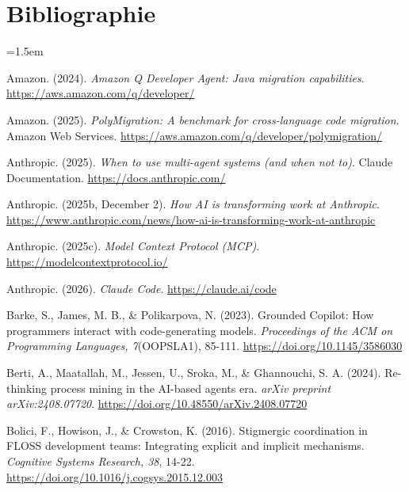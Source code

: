 
\chapter*{Bibliographie}

\begingroup
\setlength{\parskip}{0.6em}
\setlength{\parindent}{-1.5em}
\leftskip=1.5em\noindent



Amazon. (2024). \emph{Amazon Q Developer Agent: Java migration
capabilities}. \url{https://aws.amazon.com/q/developer/}

Amazon. (2025). \emph{PolyMigration: A benchmark for cross-language code
migration}. Amazon Web Services.
\url{https://aws.amazon.com/q/developer/polymigration/}

Anthropic. (2025). \emph{When to use multi-agent systems (and when not
to)}. Claude Documentation. \url{https://docs.anthropic.com/}

Anthropic. (2025b, December 2). \emph{How AI is transforming work at
Anthropic}.
\url{https://www.anthropic.com/news/how-ai-is-transforming-work-at-anthropic}

Anthropic. (2025c). \emph{Model Context Protocol (MCP)}.
\url{https://modelcontextprotocol.io/}

Anthropic. (2026). \emph{Claude Code}. \url{https://claude.ai/code}

Barke, S., James, M. B., \& Polikarpova, N. (2023). Grounded Copilot:
How programmers interact with code-generating models. \emph{Proceedings
of the ACM on Programming Languages, 7}(OOPSLA1), 85-111.
\url{https://doi.org/10.1145/3586030}

Berti, A., Maatallah, M., Jessen, U., Sroka, M., \& Ghannouchi, S. A.
(2024). Re-thinking process mining in the AI-based agents era.
\emph{arXiv preprint arXiv:2408.07720}.
\url{https://doi.org/10.48550/arXiv.2408.07720}

Bolici, F., Howison, J., \& Crowston, K. (2016). Stigmergic coordination
in FLOSS development teams: Integrating explicit and implicit
mechanisms. \emph{Cognitive Systems Research, 38}, 14-22.
\url{https://doi.org/10.1016/j.cogsys.2015.12.003}

